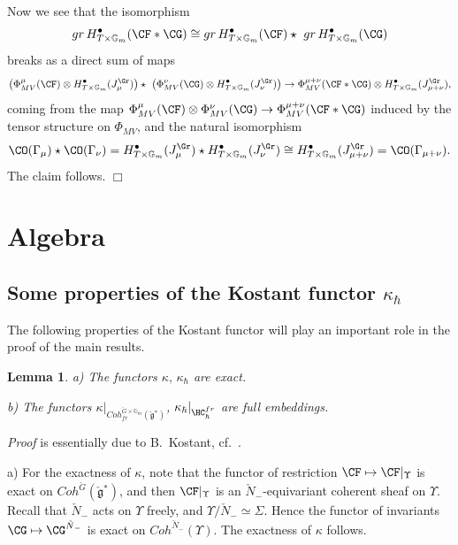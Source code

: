 \documentclass[11pt]{amsart}
\newtheorem{lem}{Lemma}
\theoremstyle{definition}
\theoremstyle{remark}
\theoremstyle{remark}
\newcommand{\bu}{\bullet}
\newcommand{\<}{\langle}
\renewcommand{\>}{\rangle}
\newcommand{\Lg}{\check{\mathfrak g}{}}
\newcommand{\LN}{\check{N}{}}
\newcommand{\LG}{{\check{G}}}
\newcommand{\Gm}{{{\mathbb G}_m}}
\newcommand{\HChfr}{\HC_\hbar^{fr}}
\newcommand{\kappah}{{\kappa_\hbar}}
\renewcommand{\proof}{{\it Proof }}
\begin{document}
Now we see that the isomorphism 
$$gr\, H_{T\times \Gm}^\bu(\CF*\CG ) \cong 
gr\, H_{T\times \Gm}^\bu(\CF)\star\ 
gr\, H_{T\times \Gm}^\bu(\CG )$$
breaks as a direct sum of maps 
$$\left(\Phi_{MV}^\mu(\CF) \otimes 
H_{T\times \Gm}^\bu(J_\mu^{\Gr})\right)\star\ 
\left(\Phi_{MV}^\nu(\CG) \otimes H_{T\times \Gm}^\bu(J_\nu^{\Gr})\right)
\to \Phi_{MV}^{\mu+\nu}
(\CF*\CG) \otimes  H_{T\times \Gm}^\bu(J_{\mu+\nu}^{\Gr}),
$$
coming from the map $\Phi_{MV}^\mu(\CF)\otimes \Phi_{MV}^\nu(\CG)
\to \Phi_{MV}^{\mu+\nu}(\CF*\CG)$ induced by the tensor structure
on $\Phi_{MV}$, and the natural isomorphism
$$ \CO(\Gamma_\mu)\star\CO(\Gamma_\nu)=
H_{T\times \Gm}^\bu(J_\mu^{\Gr})\star
 H_{T\times \Gm}^\bu(J_\nu^{\Gr})
 \cong  H_{T\times \Gm}^\bu(J_{\mu+\nu}^{\Gr})=\CO(\Gamma_{\mu+\nu}).$$
The claim follows. \hfill $\Box$










\section{Algebra}

\subsection{Some properties of the Kostant functor $\kappa_\hbar$} 
The following properties of the Kostant functor will play an important role
in the proof of the main results.

\begin{lem}
\label{propKons}
a) The functors $\kappa,\, \kappah$ are exact.

b) The functors %
$\kappa|_{Coh_{fr}^{\LG\times \Gm}(\Lg^*)}$,
$\kappah|_{\HChfr}$ are full embeddings.
\end{lem} 

\proof is essentially due to B.~Kostant, cf.~\cite{K1}.

a) For the exactness of $\kappa$, note that the functor of restriction
$\CF\mapsto\CF|_\Upsilon$ is exact on $Coh^\LG(\Lg^*)$, and then
$\CF|_\Upsilon$ is an $\LN_-$-equivariant coherent sheaf on $\Upsilon$.
Recall that $\LN_-$ acts on $\Upsilon$ freely, and
$\Upsilon/\LN_-\simeq\Sigma$. Hence the functor of invariants
$\CG\mapsto\CG^{\LN_-}$ is exact on $Coh^{\LN_-}(\Upsilon)$.
The exactness of $\kappa$ follows.
\end{document}
